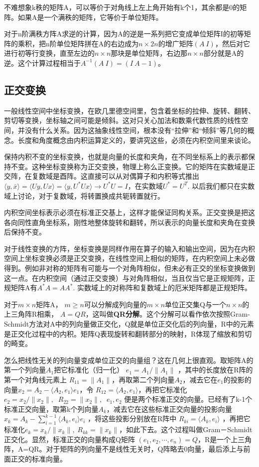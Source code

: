 不难想象k秩的矩阵A，可以等价于对角线上左上角开始有k个1，其余都是0的矩阵。如果A是一个满秩的矩阵，它等价于单位矩阵。

对于n阶满秩方阵A求逆的计算，因为A的逆是一系列把它变成单位矩阵I的初等矩阵的乘积，把n阶单位矩阵拼在A的右边成为$ n\times 2 n$的增广矩阵$ (A\ I)$，然后对它进行初等行变换，直至左边的$ n\times n $那块是单位矩阵，右边那$ n\times n $部分就是A的逆。这个计算过程相当于$ A^{-1}(A\ I)=(I\ A-1) $。

\subsection{正交变换}

一般线性空间中坐标变换，在欧几里德空间里，包含着坐标的拉伸、旋转、翻转、剪切等变换，坐标轴之间可能是倾斜。这对只关心加法和数乘代数性质的线性空间，并没有什么关系。因为这抽象线性空间，根本没有“拉伸”和“倾斜”等几何的概念。长度和角度概念由内积运算定义的，要讲究这些，必须在内积空间里来谈论。

保持内积不变的坐标变换，也就是向量的长度和夹角，在不同坐标系上的表示都保持不变。这种坐标变换称为正交变换，物理上称么正变换。它的矩阵在实数域是正交阵，在复数域是酉阵。这直接可以从对偶算子和内积等式推出$ \langle y, \bar{x}\rangle=\langle Uy, Ux\rangle=\langle y,U^{*} Ux\rangle \rightarrow U^{*}U=I $，在实数域$ U^{*} = U^{T}  $. 以后我们都只在实数域上讨论，对于复数域，将转置换成共轭转置就行。

内积空间坐标表示必须在标准正交基上，这样才能保证同构关系。正交变换是把这各向同性直角坐标系，刚性地整体旋转和翻转，所以表示的向量长度和夹角在变换后保持不变。

对于线性变换的方阵，坐标变换是同样作用在算子的输入和输出空间，因为在内积空间上坐标变换必须是正交变换，在线性空间上相似的矩阵，在内积空间上未必做得到。例如非对称的矩阵有可能与一个对角阵相似，但未必有正交的坐标变换做到这一点。在内积空间（通过正交变换）与对角阵相似，当且仅当它是正规矩阵，正规矩阵A有$ A^{*}A  = AA^{*} $. 实数域上的对称阵和复数域上的厄米矩阵都是正规矩阵。

对于$ m\times n $矩阵A， $ m\ge n $可以分解成列向量的$ m\times n $单位正交集Q与一个$ n\times n $的上三角阵R相乘， $ A=QR $，这叫做\textbf{QR分解}。这个分解可以看作依次按照Gram-Schmidt方法对A中的列向量做正交化，Q就是单位正交化后的列向量，R中的元素是正交化过程中的内积。矩阵Q表现旋转和翻转部分的映射，R体现了缩放和剪切的畸变。

怎么把线性无关的列向量变成单位正交的向量组？这在几何上很直观。取矩阵A的第一个列向量$ A_1 $把它标准化（归一化） $ e_1 = A_1/\|A_1\| $ ，其中的长度放在R阵的第一个对角线元素上 $ R_{11}=\|A_1\| $，再取第二个列向量$  A_2  $，减去它在$ e_1 $的投影的向量$ x_2 = A_2 - \langle A_2, e_1 \rangle e_1 $，令 $ R_{12}=\langle A_2, e_1 \rangle $，再把它标准化$ e_2 = x_2/\|x_2\| ,\;\;R_{22}=\|x_2\|,\;\;e_1, e_2 $ 便是两个标准正交的向量。已经有了k-1个标准正交向量，取第k个列向量$ A_k $，减去它在这些标准正交向量的投影向量 $ x_{k} = A_{k} - \sum_{i=1}^{k-1} \langle A_{k}, e_i \rangle e_i $ ，将这些投影分别放在R阵中 $ R_{ki}= \langle A_k, e_i \rangle $ ，再把它标准化$ e_k = x_k/\|x_k\|, \; R_{kk}= \|x_k\| $，如此下去。这个过程叫做Gram－Schmidt正交化。显然，标准正交的向量构成Q矩阵 $ (e_1, e_2,\cdots ,e_n)=Q $，R是一个上三角阵，A=QR。对于矩阵的列向量不是线性无关时，Q阵略去0向量，最后添上与前面正交的标准向量。

